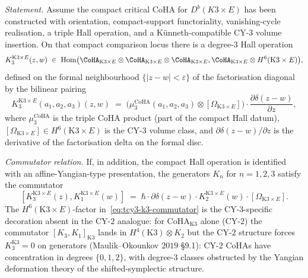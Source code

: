 \begin{proposition}
\label{prop:tcy3-sv-degree-3-generator}
\emph{Statement.} Assume the compact critical CoHA for
$D^b(K3\times E)$ has been constructed with orientation, compact-support
functoriality, vanishing-cycle realisation, a triple Hall operation, and
a K\"unneth-compatible CY-$3$ volume insertion. On that compact
comparison locus there is a degree-$3$ Hall operation
\[
 K_3^{\mathrm{K3}\times E}(z,w)
 \;\in\; \mathrm{Hom}\bigl(
 \CoHA_{\mathrm{K3}\times E} \otimes \CoHA_{\mathrm{K3}\times E} \otimes \CoHA_{\mathrm{K3}\times E},
 \CoHA_{\mathrm{K3}\times E} \otimes H^6(\mathrm{K3}\times E)
 \bigr),
\]
defined on the formal neighbourhood $\{|z - w| < \varepsilon\}$ of the
factorisation diagonal by the bilinear pairing
\begin{equation}
\label{eq:tcy3-k3-degree-3-explicit}
 K_3^{\mathrm{K3}\times E}(a_1, a_2, a_3)(z, w)
 \;=\;
 \bigl(
 \mu_3^{\mathrm{CoHA}}(a_1, a_2, a_3)
 \otimes
 [\Omega_{\mathrm{K3}\times E}]
 \bigr)
 \cdot
 \frac{\partial \delta(z-w)}{\partial z},
\end{equation}
where $\mu_3^{\mathrm{CoHA}}$ is the triple CoHA product
(part of the compact Hall datum), $[\Omega_{\mathrm{K3}\times E}]\in
H^6(\mathrm{K3}\times E)$ is the CY-$3$ volume class, and
$\partial\delta(z-w)/\partial z$ is the derivative of the factorisation
delta on the formal disc.

\emph{Commutator relation.} If, in addition, the compact Hall operation
is identified with an affine-Yangian-type presentation, the generators
$K_n$ for $n=1,2,3$ satisfy the commutator
\begin{equation}
\label{eq:tcy3-k3-commutator}
 [K_3^{\mathrm{K3}\times E}(z), K_1^{\mathrm{K3}\times E}(w)]
 \;=\;
 \hbar \cdot \partial\delta(z - w) \cdot
 K_2^{\mathrm{K3}\times E}(w)
 \cdot
 [\Omega_{\mathrm{K3}\times E}].
\end{equation}
The $H^6(\mathrm{K3}\times E)$-factor in~\eqref{eq:tcy3-k3-commutator}
is the CY-$3$-specific decoration absent in the CY-$2$ analogue: for
$\mathrm{CoHA}_{\mathrm{K3}}$ alone (CY-$2$) the commutator
$[K_3, K_1]_{\mathrm{K3}}$ lands in $H^4(\mathrm{K3})\otimes K_2$ but
the CY-$2$ structure forces $K_3^{\mathrm{K3}} = 0$ on generators
(Maulik--Okounkov $2019$ \S 9.1): CY-$2$ CoHAs have concentration in
degrees $\{0,1,2\}$, with degree-$3$ classes obstructed by the
Yangian deformation theory of the shifted-symplectic structure.


\end{proposition}
